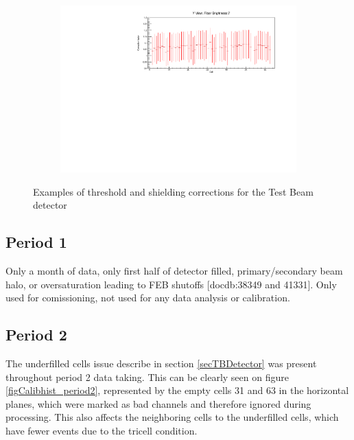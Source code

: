 \documentclass[12pt,a4paper]{article}
\begin{document}
\begin{figure}[hbtp]
\begin{subfigure}[t]{0.9\textwidth}
\includegraphics[width=\textwidth]{Plots/ThresholdCorrectionExample_cyview_fb7_P4DataBasedSim.pdf}
\end{subfigure}
\caption{Examples of threshold and shielding corrections for the Test Beam detector}
\label{figTBThresholdCorrections}
\end{figure}

\subsection{Period 1}
Only a month of data, only first half of detector filled, primary/secondary beam halo, or oversaturation leading to FEB shutoffs [docdb:38349 and 41331].
Only used for comissioning, not used for any data analysis or calibration.

\subsection{Period 2}
The underfilled cells issue describe in section \ref{secTBDetector} was present throughout period 2 data taking. This can be clearly seen on figure \ref{figCalibhist_period2}, represented by the empty cells 31 and 63 in the horizontal planes, which were marked as bad channels and therefore ignored during processing. This also affects the neighboring cells to the underfilled cells, which have fewer events due to the tricell condition.
\end{document}
